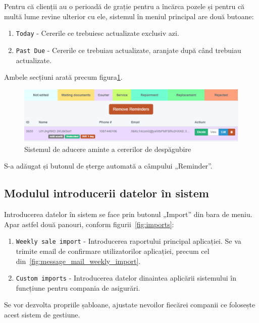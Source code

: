 		Pentru că clienții au o perioadă de grație pentru a încărca pozele și pentru că multă lume revine ulterior cu ele, sistemul în meniul principal are două butoane:
		\begin{enumerate}
			\item \verb|Today| - Cererile ce trebuiesc actualizate exclusiv azi.
			\item \verb|Past Due| - Cererile ce trebuiau actualizate, aranjate după când trebuiau actualizate.
		\end{enumerate}
		Ambele secțiuni arată precum figura\ref{fig:claims_reminders}.
		\begin{figure}
			\includegraphics[width=\linewidth]{../imagini/claims_reminder_view.png}
			\caption{Sistemul de aducere aminte a cererilor de despăgubire}
			\label{fig:claims_reminders}
		\end{figure}
		S-a adăugat și butonul de șterge automată a câmpului  „Reminder”.

	\subsection{Modulul introducerii datelor în sistem}

		Introducerea datelor în sistem se face prin butonul „Import” din bara de meniu.
		Apar astfel două panouri, conform figurii~\ref{fig:imports}:
		\begin{enumerate}
			\item \verb|Weekly sale import| - Introducerea raportului principal aplicației. Se va trimite email de confirmare utilizatorilor aplicației, precum cel din~\ref{fig:message_mail_weekly_import}.
			\item \verb|Custom imports| - Introducerea datelor dinaintea aplicării sistemului în funcțiune pentru compania de asigurări.
		\end{enumerate}

		Se vor dezvolta propriile șabloane, ajustate nevoilor fiecărei companii ce folosește acest sistem de gestiune.

